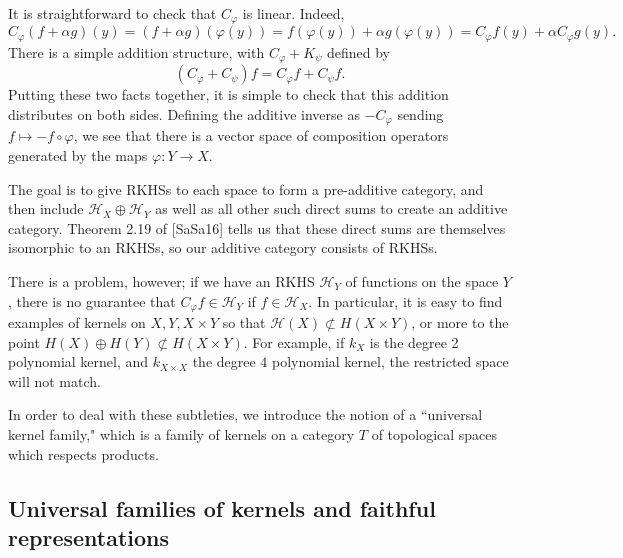 \documentclass[12pt]{amsart}
\theoremstyle{definition}
\numberwithin{equation}{section}
\begin{document}
It is straightforward to check that $C_\varphi$ is linear. Indeed, \[C_\varphi(f+\alpha g)(y) = (f+\alpha g)(\varphi (y)) = f(\varphi(y))+\alpha g(\varphi(y))= C_\varphi f(y)+\alpha C_\varphi g(y).\] There is a simple addition structure, with $C_\varphi + K_\psi$ defined by \[(C_\varphi + C_\psi)f = C_\varphi f+C_\psi f.\] Putting these two facts together, it is simple to check that this addition distributes on both sides. Defining the additive inverse as $-C_\varphi$ sending $f \mapsto -f\circ \varphi$, we see that there is a vector space of composition operators generated by the maps $\varphi: Y\rightarrow X$. 

The goal is to give RKHSs to each space to form a pre-additive category, and then include $\mathcal H_X \oplus \mathcal H_Y$ as well as all other such direct sums to create an additive category. Theorem 2.19 of [SaSa16] tells us that these direct sums are themselves isomorphic to an RKHSs, so our additive category consists of RKHSs. 

There is a problem, however; if we have an RKHS $\mathcal H_Y$ of functions on the space $Y$, there is no guarantee that $C_\varphi f \in \mathcal H_Y$ if $f \in \mathcal H_X$. In particular, it is easy to find examples of kernels on $X, Y, X \times Y$ so that $\mathcal H(X) \not \subset H(X\times Y)$, or more to the point $H(X) \oplus H(Y) \not \subset H(X\times Y)$. For example, if $k_X$ is the degree 2 polynomial kernel, and $k_{X\times X}$ the degree $4$ polynomial kernel, the restricted space will not match. 

In order to deal with these subtleties, we introduce the notion of a ``universal kernel family," which is a family of kernels on a category $T$ of topological spaces which respects products. 

\subsection{Universal families of kernels and faithful representations}
\end{document}
